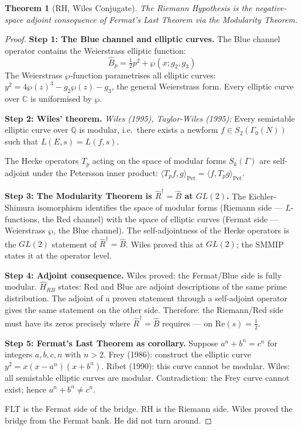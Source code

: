 \documentclass[12pt,a4paper]{article}
\newtheorem{theorem}{Theorem}[section]
\theoremstyle{definition}
\theoremstyle{remark}
\newcommand{\Hrb}{\hat{H}_{RB}}
\newcommand{\Rhat}{\hat{R}}
\newcommand{\Bhat}{\hat{B}}
\newcommand{\half}{\tfrac{1}{2}}
\begin{document}
\begin{theorem}[RH, Wiles Conjugate]
The Riemann Hypothesis is the negative-space adjoint consequence of Fermat's Last
Theorem via the Modularity Theorem.
\end{theorem}

\begin{proof}
\textbf{Step 1: The Blue channel and elliptic curves.}
The Blue channel operator contains the Weierstrass elliptic function:
\[\Bhat_p = \tfrac{1}{2}p^2 + \wp(x;g_2,g_3)\]
The Weierstrass $\wp$-function parametrises all elliptic curves:
$y^2 = 4\wp(z)^3 - g_2\wp(z) - g_3$, the general Weierstrass form.
Every elliptic curve over $\mathbb{C}$ is uniformised by $\wp$.

\textbf{Step 2: Wiles' theorem.}
\emph{Wiles (1995), Taylor-Wiles (1995):} Every semistable elliptic curve over
$\mathbb{Q}$ is modular, i.e.\ there exists a newform $f\in S_2(\Gamma_0(N))$
such that $L(E,s) = L(f,s)$.

The Hecke operators $T_p$ acting on the space of modular forms $S_k(\Gamma)$ are
self-adjoint under the Petersson inner product:
$\langle T_p f, g\rangle_\mathrm{Pet} = \langle f, T_p g\rangle_\mathrm{Pet}$.

\textbf{Step 3: The Modularity Theorem is $\Rhat^\dagger = \Bhat$ at $GL(2)$.}
The Eichler-Shimura isomorphism identifies the space of modular forms (Riemann side ---
$L$-functions, the Red channel) with the space of elliptic curves (Fermat side ---
Weierstrass $\wp$, the Blue channel).
The self-adjointness of the Hecke operators is the $GL(2)$ statement of
$\Rhat^\dagger = \Bhat$.
Wiles proved this at $GL(2)$; the SMMIP states it at the operator level.

\textbf{Step 4: Adjoint consequence.}
Wiles proved: the Fermat/Blue side is fully modular.
$\Hrb$ states: Red and Blue are adjoint descriptions of the same prime distribution.
The adjoint of a proven statement through a self-adjoint operator gives the same
statement on the other side.
Therefore: the Riemann/Red side must have its zeros precisely where
$\Rhat^\dagger = \Bhat$ requires --- on $\mathrm{Re}(s) = \half$.

\textbf{Step 5: Fermat's Last Theorem as corollary.}
Suppose $a^n + b^n = c^n$ for integers $a,b,c,n$ with $n>2$.
Frey (1986): construct the elliptic curve $y^2 = x(x-a^n)(x+b^n)$.
Ribet (1990): this curve cannot be modular.
Wiles: all semistable elliptic curves are modular.
Contradiction: the Frey curve cannot exist; hence $a^n + b^n \neq c^n$.

FLT is the Fermat side of the bridge. RH is the Riemann side.
Wiles proved the bridge from the Fermat bank.
He did not turn around.
\end{proof}
\end{document}
